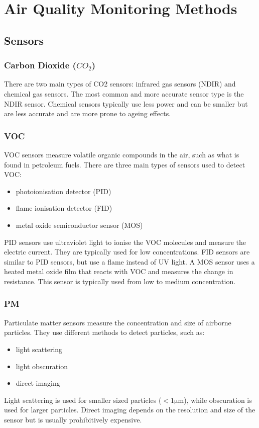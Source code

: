 \section{Air Quality Monitoring Methods}

\subsection{Sensors}
\subsubsection{Carbon Dioxide ($CO_2$)}
There are two main types of CO2 sensors: infrared gas sensors (NDIR) and chemical gas sensors. \cite{disruptive:co2sensor}
The most common and more accurate sensor type is the NDIR sensor. Chemical sensors typically use less power and can be smaller but are less accurate and are more prone to ageing effects.

\subsubsection{VOC}
VOC sensors measure volatile organic compounds in the air, such as what is found in petroleum fuels. There are three main types of sensors used to detect VOC\cite{ourpcb:vocsensor}\cite{utmel:vocsensor}:

\begin{itemize}
	\item photoionisation detector (PID)
	\item flame ionisation detector (FID)
	\item metal oxide semiconductor sensor (MOS)
\end{itemize}
PID sensors use ultraviolet light to ionise the VOC molecules and measure the electric current. They are typically used for low concentrations.
FID sensors are similar to PID sensors, but use a flame instead of UV light.
A MOS sensor uses a heated metal oxide film that reacts with VOC and measures the change in resistance. This sensor is typically used from low to medium concentration.\cite{ourpcb:vocsensor}\cite{utmel:vocsensor} 




\subsubsection{PM}
Particulate matter sensors measure the concentration and size of airborne particles. They use different methods to detect particles, such as:
\begin{itemize}
	\item light scattering
	\item light obscuration
	\item direct imaging
\end{itemize}
Light scattering is used for smaller sized particles ($<1 \si{\micro\meter} $), while obscuration is used for larger particles\cite{thomasnet:particlesensor}. Direct imaging depends on the resolution and size of the sensor but is usually prohibitively expensive.

